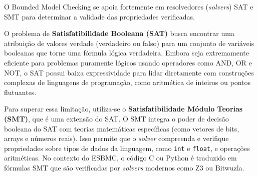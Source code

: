 O Bounded Model Checking se apoia fortemente em resolvedores (\textit{solvers}) SAT e SMT para determinar a validade das propriedades verificadas.

O problema de \textbf{Satisfatibilidade Booleana (SAT)} busca encontrar uma atribuição de valores verdade (verdadeiro ou falso) para um conjunto de variáveis booleanas que torne uma fórmula lógica verdadeira. Embora seja extremamente eficiente para problemas puramente lógicos usando operadores como AND, OR e NOT, o SAT possui baixa expressividade para lidar diretamente com construções complexas de linguagens de programação, como aritmética de inteiros ou pontos flutuantes.

Para superar essa limitação, utiliza-se o \textbf{Satisfatibilidade Módulo Teorias (SMT)}, que é uma extensão do SAT. O SMT integra o poder de decisão booleana do SAT com teorias matemáticas específicas (como vetores de bits, arrays e números reais). Isso permite que o \textit{solver} compreenda e verifique propriedades sobre tipos de dados da linguagem, como \texttt{int} e \texttt{float}, e operações aritméticas. No contexto do ESBMC, o código C ou Python é traduzido em fórmulas SMT que são verificadas por \textit{solvers} modernos como Z3 ou Bitwuzla.

